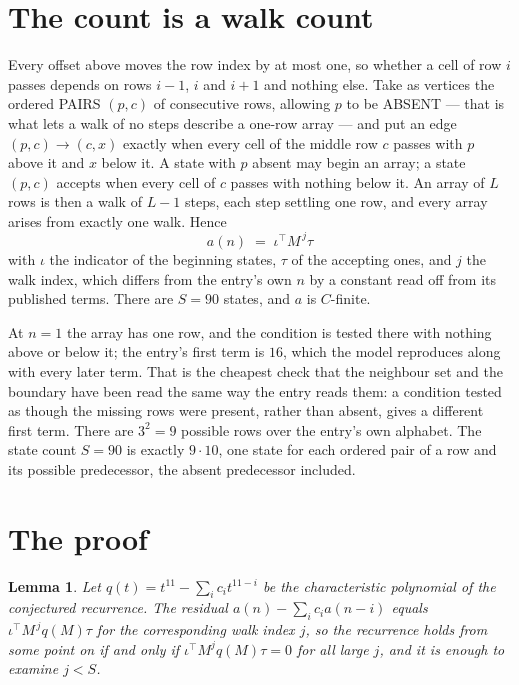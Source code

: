 \documentclass[11pt,a4paper]{article}
\theoremstyle{plain}
\newtheorem{lemma}[theorem]{Lemma}
\theoremstyle{definition}
\begin{document}
\section{The count is a walk count}

Every offset above moves the row index by at most one, so whether a cell of row $i$ passes
depends on rows $i-1$, $i$ and $i+1$ and nothing else. Take as vertices the ordered PAIRS
$(p,c)$ of consecutive rows, allowing $p$ to be ABSENT --- that is what lets a walk of no steps
describe a one-row array --- and put an edge $(p,c)\to(c,x)$ exactly when every cell of the
middle row $c$ passes with $p$ above it and $x$ below it. A state with $p$ absent may begin an
array; a state $(p,c)$ accepts when every cell of $c$ passes with nothing below it. An array of
$L$ rows is then a walk of $L-1$ steps, each step settling one row, and every array arises from
exactly one walk. Hence
\[
a(n)\;=\;\iota^{\!\top}M^{\,j}\tau
\]
with $\iota$ the indicator of the beginning states, $\tau$ of the accepting ones, and $j$ the
walk index, which differs from the entry's own $n$ by a constant read off from its published
terms. There are $S=90$ states, and $a$ is $C$-finite.

At $n=1$ the array has one row, and
the condition is tested there with nothing above or below it; the entry's first term is
$16$, which the model reproduces along with every later term. That is the cheapest check
that the neighbour set and the boundary have been read the same way the entry reads them: a
condition tested as though the missing rows were present, rather than absent, gives a different
first term. There are $3^{2}=9$ possible rows over the entry's own alphabet. The state count $S=90$ is exactly $9\cdot10$,
one state for each ordered pair of a row and its possible predecessor, the absent predecessor
included.

\section{The proof}

\begin{lemma}\label{lem:crit}
Let $q(t)=t^{11}-\sum_i c_it^{11-i}$ be the characteristic polynomial of the
conjectured recurrence. The residual $a(n)-\sum_ic_ia(n-i)$ equals
$\iota^{\!\top}M^{\,j}q(M)\tau$ for the corresponding walk index $j$, so the recurrence
holds from some point on if and only if $\iota^{\!\top}M^{j}q(M)\tau=0$ for all large $j$,
and it is enough to examine $j<S$.
\end{lemma}
\end{document}
